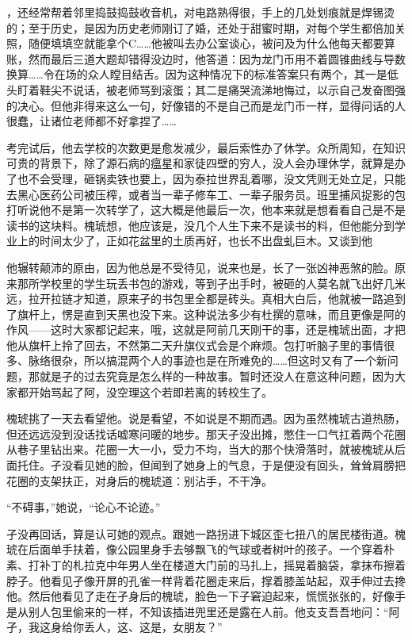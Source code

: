 \documentclass{article}
\begin{document}
\newpage 

，还经常帮着邻里捣鼓捣鼓收音机，对电路熟得很，手上的几处划痕就是焊锡烫的；至于历史，是因为历史老师刚订了婚，还处于甜蜜时期，对每个学生都倍加关照，随便填填空就能拿个C……他被叫去办公室谈心，被问及为什么他每天都要算账，然而最后三道大题却错得没边时，他答道：因为龙门币用不着圆锥曲线与导数换算……令在场的众人瞠目结舌。因为这种情况下的标准答案只有两个，其一是低头盯着鞋尖不说话，被老师骂到滚蛋；其二是痛哭流涕地悔过，以示自己发奋图强的决心。但他非得来这么一句，好像错的不是自己而是龙门币一样，显得问话的人很蠢，让诸位老师都不好拿捏了……

考完试后，他去学校的次数更是愈发减少，最后索性办了休学。众所周知，在知识可贵的背景下，除了源石病的瘟星和家徒四壁的穷人，没人会办理休学，就算是办了也不会受理，砸锅卖铁也要上，因为泰拉世界乱着哪，没文凭则无处立足，只能去黑心医药公司被压榨，或者当一辈子修车工、一辈子服务员。班里捕风捉影的包打听说他不是第一次转学了，这大概是他最后一次，他本来就是想看看自己是不是读书的这块料。槐琥想，他应该是，没几个人生下来不是读书的料，但他能分到学业上的时间太少了，正如花盆里的土质再好，也长不出盘虬巨木。又谈到他

\newpage 

他辗转颠沛的原由，因为他总是不受待见，说来也是，长了一张凶神恶煞的脸。原来那所学校里的学生玩丢书包的游戏，等到孑出手时，被砸的人莫名就飞出好几米远，拉开拉链才知道，原来孑的书包里全都是砖头。真相大白后，他就被一路追到了旗杆上，愣是直到天黑也没下来。这种说法多少有杜撰的意味，而且更像是阿的作风——这时大家都记起来，哦，这就是阿前几天刚干的事，还是槐琥出面，才把他从旗杆上拎了回去，不然第二天升旗仪式会是个麻烦。包打听脑子里的事情很多、脉络很杂，所以搞混两个人的事迹也是在所难免的……但这时又有了一个新问题，那就是孑的过去究竟是怎么样的一种故事。暂时还没人在意这种问题，因为大家都开始骂起了阿，没空理这个若即若离的转校生了。

槐琥挑了一天去看望他。说是看望，不如说是不期而遇。因为虽然槐琥古道热肠，但还远远没到没话找话嘘寒问暖的地步。那天孑没出摊，憋住一口气扛着两个花圈从巷子里钻出来。花圈一大一小，受力不均，当大的那个快滑落时，就被槐琥从后面托住。孑没看见她的脸，但闻到了她身上的气息，于是便没有回头，耸耸肩膀把花圈的支架扶正，对身后的槐琥道：别沾手，不干净。

“不碍事，”她说，“论心不论迹。”

\newpage 



孑没再回话，算是认可她的观点。跟她一路拐进下城区歪七扭八的居民楼街道。槐琥在后面单手扶着，像公园里身手去够飘飞的气球或者树叶的孩子。一个穿着朴素、打补丁的札拉克中年男人坐在楼道大门前的马扎上，摇晃着脑袋，拿抹布擦着脖子。他看见孑像开屏的孔雀一样背着花圈走来后，撑着膝盖站起，双手伸过去搀他。然后他看见了走在孑身后的槐琥，脸色一下子窘迫起来，慌慌张张的，好像手是从别人包里偷来的一样，不知该插进兜里还是露在人前。他支支吾吾地问：“阿孑，我这身给你丢人，这、这是，女朋友？”
\end{document}
